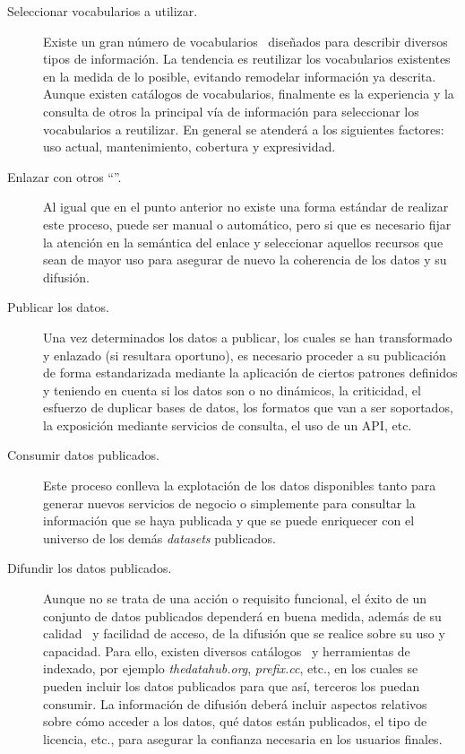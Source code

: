\begin{description}
\item [Seleccionar vocabularios a utilizar.] Existe un gran número de vocabularios~\cite{dcat-w3c} diseñados para describir
diversos tipos de información. La tendencia es reutilizar los vocabularios existentes~\cite{lod-stats} en la medida de lo posible, 
evitando remodelar información ya descrita. Aunque existen catálogos de vocabularios, finalmente es la experiencia
y la consulta de otros \datasets la principal vía de información para seleccionar los vocabularios a reutilizar.
En general se atenderá a los siguientes factores: uso actual, mantenimiento, cobertura y expresividad.

\item [Enlazar con otros ``\datasets''.] Al igual que en el punto anterior no existe una forma estándar
de realizar este proceso, puede ser manual o automático, pero si que es necesario fijar la atención en la semántica del enlace y seleccionar aquellos recursos que sean
de mayor uso para asegurar de nuevo la coherencia de los datos y su difusión.

\item [Publicar los datos.] Una vez determinados los datos a publicar, los cuales se han transformado y enlazado (si resultara oportuno), es
necesario proceder a su publicación de forma estandarizada mediante la aplicación de ciertos patrones definidos y teniendo en cuenta
si los datos son o no dinámicos, la criticidad, el esfuerzo de duplicar bases de datos, los formatos que van a ser soportados,
la exposición mediante servicios de consulta, el uso de un API, etc.
\item [Consumir datos publicados.] Este proceso conlleva la explotación de los datos disponibles tanto para generar
nuevos servicios de negocio o simplemente para consultar la información que se haya publicada y que se 
puede enriquecer con el universo de los demás \textit{datasets} publicados.
\item [Difundir los datos publicados.] Aunque no se trata de una acción o requisito funcional, el éxito de un conjunto
de datos publicados dependerá en buena medida, además de su calidad~\cite{ld-quality} y facilidad de acceso, de la difusión que se realice
sobre su uso y capacidad. Para ello, existen diversos catálogos~\cite{TummarelloDO07} y herramientas de indexado, por ejemplo
\textit{thedatahub.org}, \textit{prefix.cc}, etc., en los cuales se pueden incluir los datos publicados para que así, terceros 
los puedan consumir. La información de difusión deberá incluir aspectos relativos sobre cómo acceder a los datos, qué datos están publicados, el tipo de licencia, etc., para asegurar la confianza necesaria en los usuarios finales.

\end{description}

